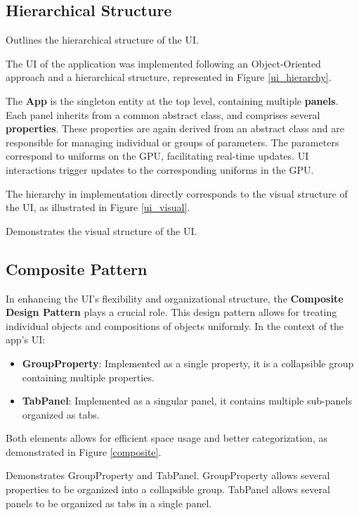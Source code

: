 \subsection{Hierarchical Structure}

{Outlines the hierarchical structure of the UI.}{}

The UI of the application was implemented following an Object-Oriented approach and a hierarchical structure, represented in Figure \ref{ui_hierarchy}.

The \textbf{App} is the singleton entity at the top level, containing multiple \textbf{panels}. Each panel inherits from a common abstract class, and comprises several \textbf{properties}. These properties are again derived from an abstract class and are responsible for managing individual or groups of parameters. The parameters correspond to uniforms on the GPU, facilitating real-time updates. UI interactions trigger updates to the corresponding uniforms in the GPU.

The hierarchy in implementation directly corresponds to the visual structure of the UI, as illustrated in Figure \ref{ui_visual}.

{Demonstrates the visual structure of the UI.}

\subsection{Composite Pattern}

In enhancing the UI's flexibility and organizational structure, the \textbf{Composite Design Pattern} plays a crucial role. This design pattern allows for treating individual objects and compositions of objects uniformly. In the context of the app's UI:

\begin{itemize}
    \item \textbf{GroupProperty}: Implemented as a single property, it is a collapsible group containing multiple properties.
    \item \textbf{TabPanel}: Implemented as a singular panel, it contains multiple sub-panels organized as tabs. 
\end{itemize}

Both elements allows for efficient space usage and better categorization, as demonstrated in Figure \ref{composite}.

{Demonstrates GroupProperty and TabPanel. GroupProperty allows several properties to be organized into a collapsible group. TabPanel allows several panels to be organized as tabs in a single panel.}

